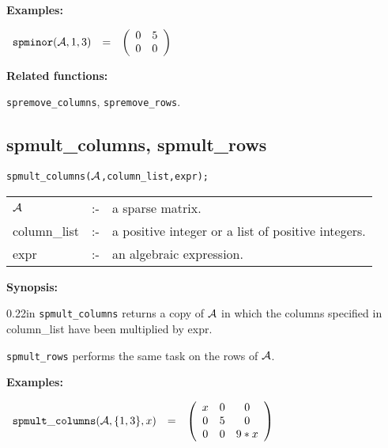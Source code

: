 {\bf Examples:}

\begin{flushleft}  
\hspace*{0.1in}
\begin{math}  
\begin{array}{ccc}
{\tt spminor}({\cal A},1,3) & = & 
        \left( \begin{array}{cc} 0 & 5 \\ 0 & 0
 \end{array} \right) 
\end{array}
\end{math}  
\end{flushleft}

{\bf Related functions:}

\hspace*{0.175in} {\tt spremove\_columns}, {\tt spremove\_rows}.


\subsection{spmult\_columns, spmult\_rows}

\hspace*{0.175in} {\tt spmult\_columns(${\cal A}$,column\_list,expr);}

\hspace*{0.1in}  
\begin{tabular}{l l l}
${\cal A}$   &:-& a sparse matrix. \\
column\_list &:-& a positive integer or a list of positive integers. \\
expr        &:-& an algebraic expression.
\end{tabular}

{\bf Synopsis:} 

\begin{addtolength}{\leftskip}{0.22in}
{\tt spmult\_columns} returns a copy of ${\cal A}$ in which
                the columns specified in column\_list have been 
multiplied by expr. 

{\tt spmult\_rows} performs the same task on the rows of ${\cal A}$.

\end{addtolength}

{\bf Examples:}

\begin{flushleft}  
\hspace*{0.1in}
\begin{math}  
\begin{array}{ccc}
{\tt spmult\_columns}({\cal A},\{1,3\},x) & = & 
        \left( \begin{array}{ccc} x & 0 & 0 \\ 0 & 5 & 0 \\ 0 & 0 & 9*x 
 \end{array} \right) 
\end{array}
\end{math}  
\end{flushleft}

